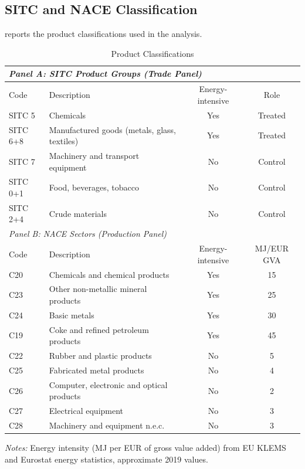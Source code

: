 \documentclass[12pt]{article}
\begin{document}
\subsection{SITC and NACE Classification}

 reports the product classifications used in the analysis.

\begin{table}[H]
\centering
\caption{Product Classifications}
\label{tab:product_class}
\small
\begin{tabular}{llcc}
\toprule
\multicolumn{4}{l}{\textit{Panel A: SITC Product Groups (Trade Panel)}} \\
\midrule
Code & Description & Energy-intensive & Role \\
\midrule
SITC 5 & Chemicals & Yes & Treated \\
SITC 6+8 & Manufactured goods (metals, glass, textiles) & Yes & Treated \\
SITC 7 & Machinery and transport equipment & No & Control \\
SITC 0+1 & Food, beverages, tobacco & No & Control \\
SITC 2+4 & Crude materials & No & Control \\
\midrule
\multicolumn{4}{l}{\textit{Panel B: NACE Sectors (Production Panel)}} \\
\midrule
Code & Description & Energy-intensive & MJ/EUR GVA \\
\midrule
C20 & Chemicals and chemical products & Yes & 15 \\
C23 & Other non-metallic mineral products & Yes & 25 \\
C24 & Basic metals & Yes & 30 \\
C19 & Coke and refined petroleum products & Yes & 45 \\
C22 & Rubber and plastic products & No & 5 \\
C25 & Fabricated metal products & No & 4 \\
C26 & Computer, electronic and optical products & No & 2 \\
C27 & Electrical equipment & No & 3 \\
C28 & Machinery and equipment n.e.c. & No & 3 \\
\bottomrule
\end{tabular}
\begin{tablenotes}[flushleft]
\small
\item \textit{Notes:} Energy intensity (MJ per EUR of gross value added) from EU KLEMS and Eurostat energy statistics, approximate 2019 values.
\end{tablenotes}
\end{table}
\end{document}
